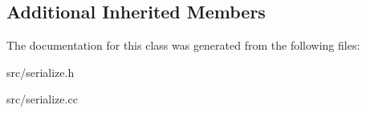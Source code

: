 \subsection*{Additional Inherited Members}


The documentation for this class was generated from the following files\+:\begin{DoxyCompactItemize}
\item 
src/serialize.\+h\item 
src/serialize.\+cc\end{DoxyCompactItemize}
